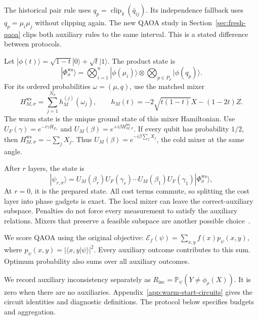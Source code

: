 \documentclass[a4paper,onecolumn,11pt,unpublished]{quantumarticle}
\theoremstyle{remark}
\begin{document}
The historical pair rule uses
$q_p=\operatorname{clip}_\delta(\bar q_{ij})$.
Its independence fallback uses $q_p=\mu_i\mu_j$ without clipping again.
The new QAOA study in Section~\ref{sec:fresh-qaoa} clips both auxiliary
rules to the same interval. This is a stated difference between protocols.

Let $|\phi(t)\rangle=\sqrt{1-t}|0\rangle+\sqrt t|1\rangle$.
The product state is
\begin{equation}
|\Phi_\sigma^{\mathrm{ws}}\rangle=
\bigotimes_{i=1}^n|\phi(\mu_i)\rangle
\otimes\bigotimes_{p\in P_\rho}|\phi(q_p)\rangle.
\label{eq:ws-state}
\end{equation}
For its ordered probabilities $\omega=(\mu,q)$, use the matched mixer
\begin{equation}
H_{M,\sigma}^{\mathrm{ws}}=\sum_{j=1}^{N_\sigma}h_M^{(j)}(\omega_j),
\qquad h_M(t)=-2\sqrt{t(1-t)}X-(1-2t)Z.
\label{eq:ws-mixer}
\end{equation}
The warm state is the unique ground state of this mixer Hamiltonian.
Use $U_F(\gamma)=e^{-i\gamma H_{F_\sigma}}$ and
$U_M(\beta)=e^{+i\beta H_{M,\sigma}^{\mathrm{ws}}}$.
If every qubit has probability $1/2$, then
$H_{M,\sigma}^{\mathrm{ws}}=-\sum_jX_j$.
Thus $U_M(\beta)=e^{-i\beta\sum_jX_j}$, the cold mixer at the same angle.

After $r$ layers, the state is
\begin{equation}
|\psi_{r,\sigma}\rangle=
U_M(\beta_r)U_F(\gamma_r)\cdots U_M(\beta_1)U_F(\gamma_1)
|\Phi_\sigma^{\mathrm{ws}}\rangle,
\label{eq:method-qaoa-ansatz}
\end{equation}
At $r=0$, it is the prepared state.
All cost terms commute, so splitting the cost layer into phase gadgets is
exact. The local mixer can leave the correct-auxiliary subspace.
Penalties do not force every measurement to satisfy the auxiliary relations.
Mixers that preserve a feasible subspace are another possible
choice~\cite{Hadfield2019}.

We score QAOA using the original objective:
$\mathcal E_f(\psi)=\sum_{x,y}f(x)p_\psi(x,y)$, where
$p_\psi(x,y)=|\langle x,y|\psi\rangle|^2$.
Every auxiliary outcome contributes to this sum.
Optimum probability also sums over all auxiliary outcomes.

We record auxiliary inconsistency separately as
$R_{\mathrm{inc}}=\mathbb P_\psi(Y\neq\phi_\rho(X))$.
It is zero when there are no auxiliaries.
Appendix~\ref{app:warm-start-circuits} gives the circuit identities and
diagnostic definitions. The protocol below specifies budgets and aggregation.
\end{document}

